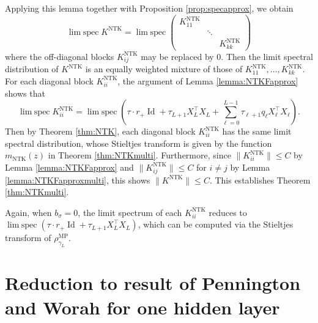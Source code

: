 \documentclass{article}
\theoremstyle{definition}
\newcommand{\Id}{\operatorname{Id}}
\newcommand{\NTK}{\text{NTK}}
\newcommand{\MP}{\text{MP}}
\newcommand{\1}{\mathbf{1}}
\newcommand{\limspec}{\operatorname{lim\;spec}}
\begin{document}
Applying this lemma together with Proposition \ref{prop:specapprox},
we obtain
\[\limspec K^\NTK =\limspec \begin{pmatrix} K_{11}^\NTK & & \\
& \ddots & \\ & & K_{kk}^\NTK \end{pmatrix}\]
where the off-diagonal blocks $K_{ij}^\NTK$ may be replaced by 0.
Then the limit spectral distribution of $K^\NTK$ is an equally weighted mixture of those
of $K_{11}^\NTK,\ldots,K_{kk}^\NTK$. For each diagonal block
$K_{ii}^{\NTK}$, the argument of Lemma \ref{lemma:NTKFapprox} shows that
\[\limspec K_{ii}^{\NTK}=\limspec
\left(\tau \cdot r_+\Id+\tau_{L+1}X_L^\top X_L+\sum_{\ell=0}^{L-1}
\tau_{\ell+1}q_\ell X_\ell^\top X_\ell\right).\]
Then by Theorem \ref{thm:NTK},
each diagonal block $K_{ii}^\NTK$ has the same limit spectral distribution, whose Stieltjes
transform is given by the function $m_\NTK(z)$ in Theorem \ref{thm:NTKmulti}.
Furthermore, since $\|K_{ii}^\NTK\| \leq C$ by Lemma \ref{lemma:NTKFapprox} and
$\|K_{ij}^\NTK\| \leq C$ for $i \neq j$ by Lemma \ref{lemma:NTKFapproxmulti},
this shows $\|K^\NTK\| \leq C$. This establishes Theorem \ref{thm:NTKmulti}.

Again, when $b_\sigma=0$, the limit spectrum of each $K_{ii}^\NTK$ reduces to $\limspec(\tau \cdot r_+\Id+\tau_{L+1}X_L^\top X_L)$, which can be computed via the Stieltjes transform of $\rho^\MP_{\gamma_L}$.

\section{Reduction to result of Pennington and Worah
\cite{pennington2017nonlinear} for one hidden
layer}\label{appendix:penningtonreduction}
\end{document}

